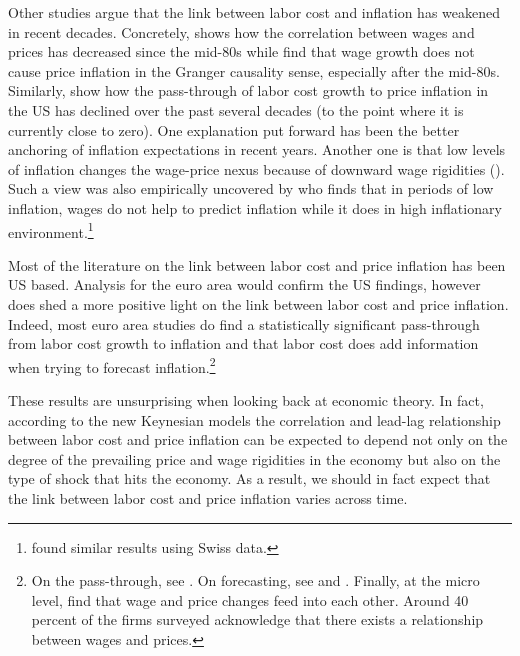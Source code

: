 \documentclass[11pt]{article}
\begin{document}
Other studies argue that the link between labor cost and inflation has weakened in recent decades. Concretely, \cite{Knotek_Zaman_2014} shows how the correlation between wages and prices has decreased since the mid-80s while \cite{Hu_Toussaint-Comeau_2010} find that wage growth does not cause price inflation in the Granger causality sense, especially after the mid-80s.  Similarly, \cite{Peneva_Rudd_2017} show how the pass-through of labor cost growth to price inflation in the US has declined over the past several decades (to the point where it is currently close to zero). One explanation put forward has been the better anchoring of inflation expectations in recent years. Another one is that low levels of inflation changes the wage-price nexus because of downward wage rigidities (\cite{Daly_Hobijn_2014}). Such a view was also empirically uncovered by \cite{Mehra_2000} who finds that in periods of low inflation, wages do not help to predict inflation while it does in high inflationary environment.\footnote{\cite{Zanetti2007} found similar results using Swiss data.}

Most of the literature on the link between labor cost and price inflation has been US based. Analysis for the euro area would confirm the US findings, however does shed a more positive light on the link between labor cost and price inflation. Indeed, most euro area studies do find a statistically significant pass-through from labor cost growth to inflation and that labor cost does add information when trying to forecast inflation.\footnote{On the pass-through, see \cite{IMF18}. On forecasting, see \cite{Dees_Gunter_14} and \cite{JarocinskiMackowiak2017}. Finally, at the micro level, \cite{WDN2009} find that wage and price changes feed into each other. Around 40 percent of the firms surveyed acknowledge that there exists a relationship between wages and prices.}

These results are unsurprising when looking back at economic theory. %
In fact, according to the new Keynesian models the correlation and lead-lag relationship between labor cost and price inflation can be expected to depend not only on the degree of the prevailing price and wage rigidities in the economy but also on the type of shock that hits the economy. As a result, we should in fact expect that the link between labor cost  and price inflation varies across time. 
\end{document}
